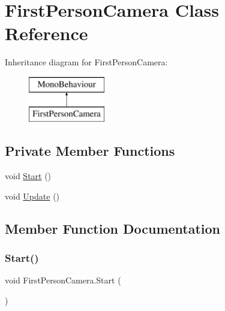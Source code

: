 \hypertarget{class_first_person_camera}{}\section{First\+Person\+Camera Class Reference}
\label{class_first_person_camera}
Inheritance diagram for First\+Person\+Camera\+:\begin{figure}[H]
\begin{center}
\leavevmode
\includegraphics[height=2.000000cm]{class_first_person_camera}
\end{center}
\end{figure}
\subsection*{Private Member Functions}
\begin{DoxyCompactItemize}
\item 
void \hyperlink{class_first_person_camera_a78e3e8f10a7ed9b250b656da3dddeda8}{Start} ()
\item 
void \hyperlink{class_first_person_camera_a0f4eab1db8fc0b912ca0858b9e723110}{Update} ()
\end{DoxyCompactItemize}


\subsection{Member Function Documentation}
\mbox{\label{class_first_person_camera_a78e3e8f10a7ed9b250b656da3dddeda8}} 
\subsubsection{\texorpdfstring{Start()}{Start()}}
{\footnotesize\ttfamily void First\+Person\+Camera.\+Start (\begin{DoxyParamCaption}{ }\end{DoxyParamCaption})\hspace{0.3cm}{\ttfamily [private]}}

\mbox{\label{class_first_person_camera_a0f4eab1db8fc0b912ca0858b9e723110}} 
